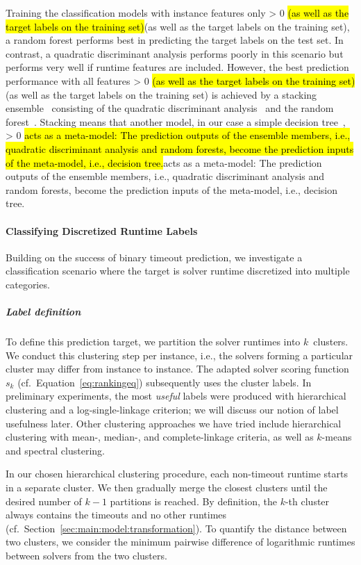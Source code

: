 \documentclass[sn-basic, Numbered]{sn-jnl} %
\newcommand{\showchanges}{1} %
\newcommand{\change}[1]{\ifnum \showchanges > 0 \sethlcolor{yellow}\hl{#1}\else#1\fi}
\begin{document}
Training the classification models with instance features only \change{(as well as the target labels on the training set)}, a random forest performs best in predicting the target labels on the test set.
In contrast, a quadratic discriminant analysis performs poorly in this scenario but performs very well if runtime features are included.
However, the best prediction performance with all features \change{(as well as the target labels on the training set)} is achieved by a stacking ensemble~\cite{wolpert1992stacked} consisting of the quadratic discriminant analysis~\cite{tharwat2016linear} and the random forest~\cite{breiman2001random}.
Stacking means that another model, in our case a simple decision tree~\cite{breiman1984classification}, \change{acts as a meta-model:
The prediction outputs of the ensemble members, i.e., quadratic discriminant analysis and random forests, become the prediction inputs of the meta-model, i.e., decision tree.}

\paragraph{Classifying Discretized Runtime Labels}

Building on the success of binary timeout prediction, we investigate a classification scenario where the target is solver runtime discretized into multiple categories.

\subparagraph{Label definition}

To define this prediction target, we partition the solver runtimes into $k$~clusters.
We conduct this clustering step per instance, i.e., the solvers forming a particular cluster may differ from instance to instance.
The adapted solver scoring function~$s_k$ (cf.~Equation~\eqref{eq:rankingeq}) subsequently uses the cluster labels.
In preliminary experiments, the most \emph{useful} labels were produced with hierarchical clustering and a log-single-linkage criterion; we will discuss our notion of label usefulness later.
Other clustering approaches we have tried include hierarchical clustering with mean-, median-, and complete-linkage criteria, as well as $k$-means and spectral clustering.

In our chosen hierarchical clustering procedure, each non-timeout runtime starts in a separate cluster.
We then gradually merge the closest clusters until the desired number of $k-1$ partitions is reached.
By definition, the $k$-th cluster always contains the timeouts and no other runtimes (cf.~Section~\ref{sec:main:model:transformation}).
To quantify the distance between two clusters, we consider the minimum pairwise difference of logarithmic runtimes between solvers from the two clusters.
\end{document}
